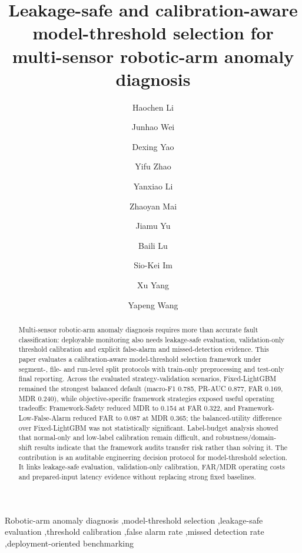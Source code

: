 \begin{frontmatter}

\title{Leakage-safe and calibration-aware model-threshold selection for multi-sensor robotic-arm anomaly diagnosis}

\author[aff1]{Haochen Li}
\author[aff1,aff2]{Junhao Wei}
\author[aff1]{Dexing Yao}
\author[aff1]{Yifu Zhao}
\author[aff1]{Yanxiao Li}
\author[aff1]{Zhaoyan Mai}
\author[aff1]{Jiamu Yu}
\author[aff1]{Baili Lu}
\author[aff3]{Sio-Kei Im}
\author[aff1]{Xu Yang}
\author[aff1]{Yapeng Wang}



\begin{abstract}
Multi-sensor robotic-arm anomaly diagnosis requires more than accurate fault classification: deployable monitoring also needs leakage-safe evaluation, validation-only threshold calibration and explicit false-alarm and missed-detection evidence. This paper evaluates a calibration-aware model-threshold selection framework under segment-, file- and run-level split protocols with train-only preprocessing and test-only final reporting. Across the evaluated strategy-validation scenarios, Fixed-\allowbreak LightGBM remained the strongest balanced default (macro-F1 0.785, PR-AUC 0.877, FAR 0.169, MDR 0.240), while objective-specific framework strategies exposed useful operating tradeoffs: Framework-\allowbreak Safety reduced MDR to 0.154 at FAR 0.322, and Framework-\allowbreak Low-\allowbreak False-\allowbreak Alarm reduced FAR to 0.087 at MDR 0.365; the balanced-utility difference over Fixed-\allowbreak LightGBM was not statistically significant. Label-budget analysis showed that normal-only and low-label calibration remain difficult, and robustness/domain-shift results indicate that the framework audits transfer risk rather than solving it. The contribution is an auditable engineering decision protocol for model-threshold selection. It links leakage-safe evaluation, validation-only calibration, FAR/MDR operating costs and prepared-input latency evidence without replacing strong fixed baselines.
\end{abstract}

\begin{keyword}
Robotic-arm anomaly diagnosis \sep model-threshold selection \sep leakage-safe evaluation \sep threshold calibration \sep false alarm rate \sep missed detection rate \sep deployment-oriented benchmarking
\end{keyword}

\end{frontmatter}



